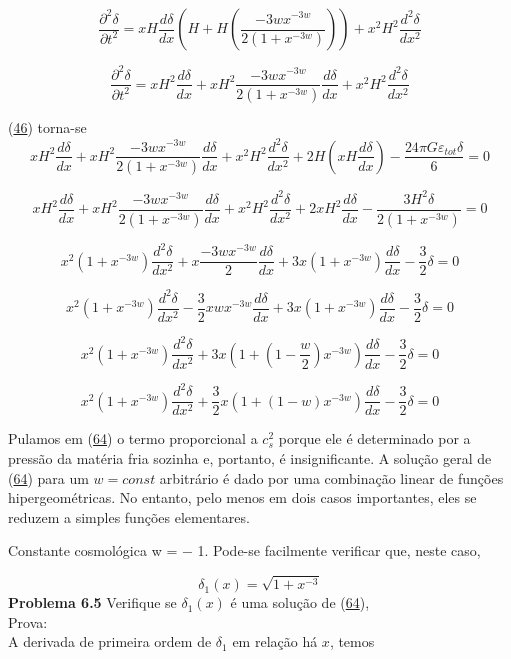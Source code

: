 \documentclass[a4paper,12pt]{article}
\begin{document}
$$\dfrac{\partial^2 \delta}{\partial t^2} = xH\dfrac{d \delta}{d x }\left( H + H \left(\dfrac{-3wx^{-3w}}{2(1 +x^{-3w})} \right)\right) + x^2H^2 \dfrac{d^2 \delta}{d x^2 }$$

$$\dfrac{\partial^2 \delta}{\partial t^2} = xH^2\dfrac{d \delta}{d x }+ xH^2 \dfrac{-3wx^{-3w}}{2(1 +x^{-3w})}\dfrac{d \delta}{d x } + x^2H^2 \dfrac{d^2 \delta}{d x^2 }$$

(\hyperref[eq46]{46}) torna-se
$$xH^2\dfrac{d \delta}{d x }+ xH^2 \dfrac{-3wx^{-3w}}{2(1 +x^{-3w})}\dfrac{d \delta}{d x } + x^2H^2 \dfrac{d^2 \delta}{d x^2 } + 2H\left( xH \dfrac{d \delta}{d x }\right)  -\dfrac{24\pi G\varepsilon_{tot}\delta}{6} = 0$$

$$xH^2\dfrac{d \delta}{d x }+ xH^2 \dfrac{-3wx^{-3w}}{2(1 +x^{-3w})}\dfrac{d \delta}{d x } + x^2H^2 \dfrac{d^2 \delta}{d x^2 } + 2xH^2 \dfrac{d \delta}{d x }  -\dfrac{3H^2\delta}{2(1+x^{-3w})} = 0$$

$$x^2(1+x^{-3w}) \dfrac{d^2 \delta}{d x^2 } +x \dfrac{-3wx^{-3w}}{2}\dfrac{d \delta}{d x } + 3x(1+x^{-3w}) \dfrac{d \delta}{d x }  -\dfrac{3}{2}\delta = 0$$

$$x^2(1+x^{-3w}) \dfrac{d^2 \delta}{d x^2 } -\dfrac{3}{2}xwx^{-3w}\dfrac{d \delta}{d x } + 3x(1+x^{-3w}) \dfrac{d \delta}{d x }  -\dfrac{3}{2}\delta = 0$$

$$x^2(1+x^{-3w}) \dfrac{d^2 \delta}{d x^2 }+ 3x(1+(1-\dfrac{w}{2})x^{-3w}) \dfrac{d \delta}{d x }  -\dfrac{3}{2}\delta = 0$$

\begin{equation}\label{eq64}
	x^2 (1+x^{-3w})\dfrac{d^2\delta}{dx^2} + \dfrac{3}{2}x(1+ (1-w)x^{-3w})\dfrac{d\delta}{dx} - \dfrac{3}{2}\delta = 0
\end{equation}

Pulamos em (\hyperref[eq64]{64}) o termo proporcional a $c_s^2$ porque ele é determinado por
a pressão da matéria fria sozinha e, portanto, é insignificante. A solução geral
de (\hyperref[eq64]{64}) para um $w = const$ arbitrário é dado por uma combinação linear de funções hipergeométricas. No entanto, pelo menos em dois casos importantes, eles se reduzem a simples funções elementares.

Constante cosmológica w = − 1. Pode-se facilmente verificar que, neste caso,

\begin{equation}\label{eq65}
	\delta_1 (x) = \sqrt{1+x^{-3}}
\end{equation}
\textbf {Problema 6.5} Verifique se $\delta_1 (x) $ é uma solução de (\hyperref[eq64]{64}),  \\
Prova:\\
A derivada de primeira ordem de $\delta_1$ em relação há $x$, temos
\end{document}

